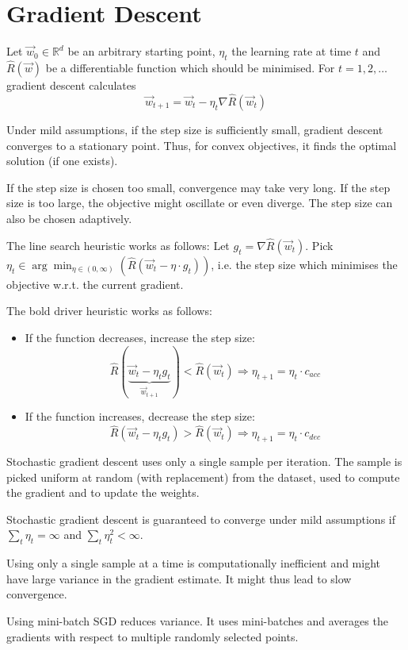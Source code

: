 \section{Gradient Descent}
Let $\vec{w}_0 \in \mathbb{R}^d$ be an arbitrary
starting point,
$\eta_t$ the learning rate at time $t$ and
$\hat{R}(\vec{w})$ be a differentiable function
which should be minimised.
For $t = 1, 2, \dotsc$ gradient descent calculates
\begin{equation*}
    \vec{w}_{t + 1} = \vec{w}_t - \eta_t
    \nabla \hat{R}(\vec{w}_t)
\end{equation*}

Under mild assumptions, if the step size is sufficiently
small, gradient descent converges to a stationary
point.
Thus, for convex objectives, it finds the optimal solution (if one exists).

If the step size is chosen too small, convergence may
take very long.
If the step size is too large, the objective might
oscillate or even diverge.
The step size can also be chosen adaptively.

The line search heuristic works as follows:
Let $g_t = \nabla \hat{R}(\vec{w}_t)$.
Pick $\eta_t \in \arg\min_{\eta \in (0, \infty)}(
    \hat{R}(\vec{w}_t - \eta \cdot g_t)
)$,
i.e. the step size which minimises the objective
w.r.t. the current gradient.

The bold driver heuristic works as follows:
\begin{itemize}
    \item If the function decreases, increase the step size:
    \begin{equation*}
        \hat{R}(\underbrace{\vec{w}_t - \eta_t g_t}_{\vec{w}_{t+1}}) < \hat{R}(\vec{w}_t)
        \Rightarrow \eta_{t + 1} = \eta_t \cdot c_{acc}
    \end{equation*}
    \item If the function increases, decrease the step size:
    \begin{equation*}
        \hat{R}(\vec{w}_t - \eta_t g_t) > \hat{R}(\vec{w}_t)
        \Rightarrow \eta_{t + 1} = \eta_t \cdot c_{dec}
    \end{equation*}
\end{itemize}

Stochastic gradient descent uses only a single
sample per iteration.
The sample is picked uniform at random
(with replacement) from the dataset,
used to compute the gradient and to update the
weights.

Stochastic gradient descent is guaranteed to
converge under mild assumptions if
$\sum_t{\eta_t} = \infty$ and
$\sum_t{\eta_t^2} < \infty$.

Using only a single sample at a time is computationally inefficient
and might have large variance in the gradient estimate.
It might thus lead to slow convergence.

Using mini-batch SGD reduces variance.
It uses mini-batches and averages the gradients with respect to
multiple randomly selected points.
